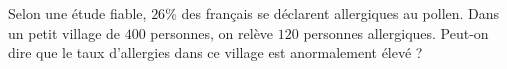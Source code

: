 
\begin{exercice}%
    \label{exosmath-0329}

    Selon une étude fiable, \( 26\%\) des français se déclarent allergiques au pollen. Dans un petit village de $400$ personnes, on relève $120$ personnes allergiques. Peut-on dire que le taux d’allergies dans ce village est anormalement élevé ?

\end{exercice}
